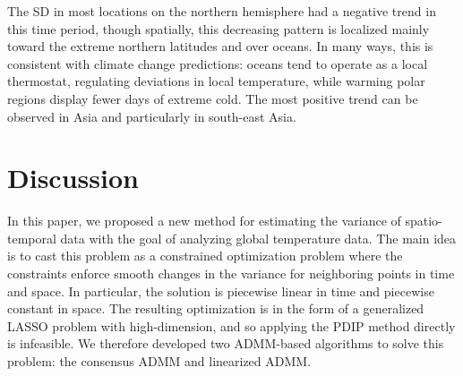 \documentclass[letterpaper]{article} %
\newcommand{\autoref}{\Cref}
\begin{document}
The SD in most locations on the northern
hemisphere had a negative trend in this time period, though spatially,
this decreasing pattern is localized mainly toward the extreme
northern latitudes and over oceans. In many ways, this is consistent
with climate change predictions: oceans tend to operate as a local
thermostat, regulating deviations in local temperature, while warming polar
regions display fewer days of extreme cold.
The most positive trend can be observed in Asia and
particularly in south-east Asia. 





\section{Discussion}
\label{sec:discussion}

In this paper, we proposed a new method for estimating the variance of
spatio-temporal data with the goal of analyzing global temperature
data. The main idea is to cast this problem as a
constrained optimization problem where the constraints enforce smooth
changes in the variance for neighboring points in time and space. In
particular, the solution is piecewise linear in time and piecewise
constant in space. The resulting optimization is in the form of a
generalized LASSO problem with high-dimension, and so applying the
PDIP method directly is infeasible. We therefore developed two
ADMM-based algorithms to solve this problem: the consensus ADMM and
linearized ADMM. 
\end{document}
